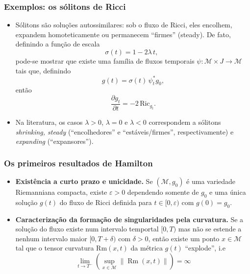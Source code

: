 \documentclass{beamer}
\newcommand{\Ric}{\mathrm{Ric}}
\newcommand{\mm}{\mathcal{M}}
\newcommand{\quotes}[1]{``#1''}
\begin{document}
\begin{frame}
\frametitle{Exemplos: os sólitons de Ricci}
\begin{itemize}
\item Sólitons são soluções autossimilares: sob o fluxo de Ricci, eles encolhem, expandem homoteticamente ou permanecem \quotes{firmes} (steady). De fato, definindo a função de escala
\[
\sigma(t) = 1 - 2\lambda \, t, \ \
\] pode-se mostrar que existe uma família de fluxos temporais $\psi: \mm \times J \to \mm$ tais que, definindo
\[
g(t) = \sigma(t) \, \psi_t^{*} g_0,
\]
então
\[
\frac{\partial g_t}{\partial t} =  - 2 \, \Ric_{g_t}.
\]
\item Na literatura, os casos $\lambda > 0$, $\lambda = 0$ e $\lambda < 0$ correspondem a sólitons \emph{shrinking, steady} (\quotes{encolhedores} e \quotes{estáveis/firmes}, respectivamente) e \emph{expanding} (\quotes{expansores}).
\end{itemize}
\end{frame}

\begin{frame}
\frametitle{Os primeiros resultados de Hamilton}
\begin{itemize}
\item \textbf{Existência a curto prazo e unicidade.} Se $(\mm, g_0)$ é uma variedade Riemanniana compacta, existe $\varepsilon > 0$ dependendo somente de $g_0$ e uma única solução $g(t)$ do fluxo de Ricci definida para $t \in [0, \varepsilon)$ com $g(0) = g_0$.
\item \textbf{Caracterização da formação de singularidades pela curvatura.} Se a solução do fluxo existe num intervalo temportal $[0, T)$ mas não se estende a nenhum intervalo maior $[0, T + \delta)$ com $\delta > 0$, então existe um ponto $x \in \mm$ tal que o tensor curvatura $\mathrm{Rm}(x, t)$ da métrica $g(t)$ \quotes{explode}, i.e
$$\lim _{t \to T^{-}}\left(\sup _{x \in \mathcal{M}} \| \operatorname{Rm}(x, t) \|\right)=\infty$$

\end{itemize}
\end{frame}
\end{document}
